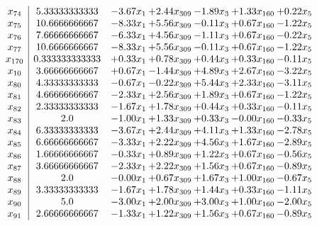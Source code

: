 \documentclass[8pt]{article}
\begin{document}
\[\begin{array}{c| c c@{\hskip 2pt} c@{\hskip 2pt} c@{\hskip 2pt} c@{\hskip 2pt} c@{\hskip 2pt} }
 x_{74}   &  5.33333333333 & -3.67 x_{1} & +  2.44 x_{309} & -1.89 x_{3} & +  1.33 x_{160} & +  0.22 x_{5}\\
 x_{75}   &  10.6666666667 & -8.33 x_{1} & +  5.56 x_{309} & -0.11 x_{3} & +  0.67 x_{160} & -1.22 x_{5}\\
 x_{76}   &  7.66666666667 & -6.33 x_{1} & +  4.56 x_{309} & -1.11 x_{3} & +  0.67 x_{160} & -0.22 x_{5}\\
 x_{77}   &  10.6666666667 & -8.33 x_{1} & +  5.56 x_{309} & -0.11 x_{3} & +  0.67 x_{160} & -1.22 x_{5}\\
 x_{170}   &  0.333333333333 & +  0.33 x_{1} & +  0.78 x_{309} & +  0.44 x_{3} & +  0.33 x_{160} & -0.11 x_{5}\\
 x_{10}   &  3.66666666667 & +  0.67 x_{1} & -1.44 x_{309} & +  4.89 x_{3} & +  2.67 x_{160} & -3.22 x_{5}\\
 x_{80}   &  4.33333333333 & -0.67 x_{1} & -0.22 x_{309} & +  5.44 x_{3} & +  2.33 x_{160} & -3.11 x_{5}\\
 x_{81}   &  4.66666666667 & -2.33 x_{1} & +  2.56 x_{309} & +  1.89 x_{3} & +  0.67 x_{160} & -1.22 x_{5}\\
 x_{82}   &  2.33333333333 & -1.67 x_{1} & +  1.78 x_{309} & +  0.44 x_{3} & +  0.33 x_{160} & -0.11 x_{5}\\
 x_{83}   &  2.0 & -1.00 x_{1} & +  1.33 x_{309} & +  0.33 x_{3} & -0.00 x_{160} & -0.33 x_{5}\\
 x_{84}   &  6.33333333333 & -3.67 x_{1} & +  2.44 x_{309} & +  4.11 x_{3} & +  1.33 x_{160} & -2.78 x_{5}\\
 x_{85}   &  6.66666666667 & -3.33 x_{1} & +  2.22 x_{309} & +  4.56 x_{3} & +  1.67 x_{160} & -2.89 x_{5}\\
 x_{86}   &  1.66666666667 & -0.33 x_{1} & +  0.89 x_{309} & +  1.22 x_{3} & +  0.67 x_{160} & -0.56 x_{5}\\
 x_{87}   &  3.66666666667 & -2.33 x_{1} & +  2.22 x_{309} & +  1.56 x_{3} & +  0.67 x_{160} & -0.89 x_{5}\\
 x_{88}   &  2.0 & -0.00 x_{1} & +  0.67 x_{309} & +  1.67 x_{3} & +  1.00 x_{160} & -0.67 x_{5}\\
 x_{89}   &  3.33333333333 & -1.67 x_{1} & +  1.78 x_{309} & +  1.44 x_{3} & +  0.33 x_{160} & -1.11 x_{5}\\
 x_{90}   &  5.0 & -3.00 x_{1} & +  2.00 x_{309} & +  3.00 x_{3} & +  1.00 x_{160} & -2.00 x_{5}\\
 x_{91}   &  2.66666666667 & -1.33 x_{1} & +  1.22 x_{309} & +  1.56 x_{3} & +  0.67 x_{160} & -0.89 x_{5}\\

\end{array}\]
\end{document}
